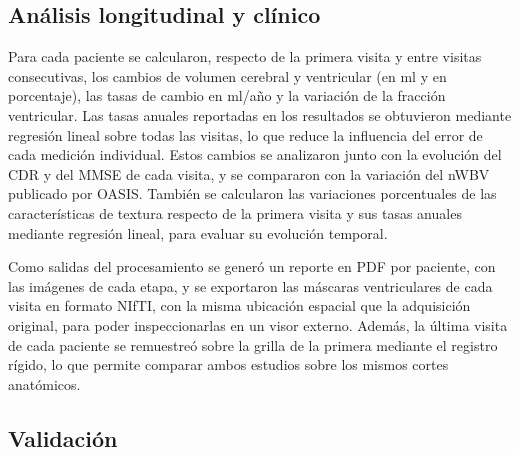 \documentclass[10pt]{article}
\begin{document}
\subsection{Análisis longitudinal y clínico}
 
Para cada paciente se calcularon, respecto de la primera visita y entre visitas consecutivas, los cambios de volumen cerebral y ventricular (en ml y en porcentaje), las tasas de cambio en ml/año y la variación de la fracción ventricular. Las tasas anuales reportadas en los resultados se obtuvieron mediante regresión lineal sobre todas las visitas, lo que reduce la influencia del error de cada medición individual. Estos cambios se analizaron junto con la evolución del CDR y del MMSE de cada visita, y se compararon con la variación del nWBV publicado por OASIS. 
También se calcularon las variaciones porcentuales de las características de textura respecto de la primera visita y sus tasas anuales mediante regresión lineal, para evaluar su evolución temporal.
 
Como salidas del procesamiento se generó un reporte en PDF por paciente, con las imágenes de cada etapa, y se exportaron las máscaras ventriculares de cada visita en formato NIfTI, con la misma ubicación espacial que la adquisición original, para poder inspeccionarlas en un visor externo. Además, la última visita de cada paciente se remuestreó sobre la grilla de la primera mediante el registro rígido, lo que permite comparar ambos estudios sobre los mismos cortes anatómicos.

\subsection{Validación}
 
\end{document}
